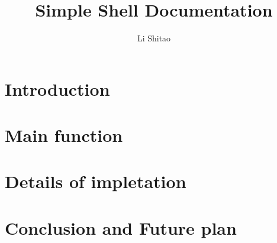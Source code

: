 \documentclass{article}
\begin{document}
\title{Simple Shell Documentation}
\author{Li Shitao}
\maketitle
\section{Introduction}
\section{Main function}
\section{Details of impletation}
\section{Conclusion and Future plan}
\end{document}
